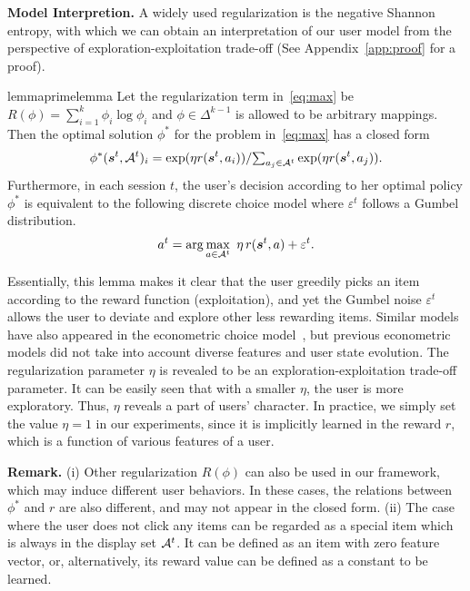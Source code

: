 \documentclass{article} %
\begin{document}
{\bf Model Interpretion.} A widely used regularization is the negative Shannon entropy, with which we can obtain an interpretation of our user model from the perspective of exploration-exploitation trade-off (See Appendix~\ref{app:proof} for a proof). 
\begin{restatable}{lemma}{primelemma}\label{lm:lemma1}
Let the regularization term in~\eqref{eq:max} be $R(\phi) = \sum_{i=1}^k \phi_i \log \phi_i$ and $\phi \in \Delta^{k-1}$ is allowed to be arbitrary mappings. Then the optimal solution $\phi^*$ for the problem in~\eqref{eq:max} has a closed form
\begin{equation}\label{eq:exp}
	\phi^\ast({\bm{s}}^t,{\mathcal{A}}^t)_i =\exp(\eta r({\bm{s}}^t, a_i))/{\textstyle \sum_{a_j \in {\mathcal{A}}^t}}\exp(\eta r({\bm{s}}^t, a_j)).
\end{equation}
Furthermore, in each session $t$, the user's decision according to her optimal policy $\phi^*$ is equivalent to the following discrete choice model where $\varepsilon^t$ follows a Gumbel distribution.
\begin{equation}\label{eq:gumbel}
 	a^t = \arg\max_{a \in {\mathcal{A}}^t }~\eta\, r({\bm{s}}^t, a) + \varepsilon^t.
 \end{equation}
\end{restatable}
\vspace{-2.5mm}
Essentially, this lemma makes it clear that the user greedily picks an item according to the reward function (exploitation), and yet the Gumbel noise $\varepsilon^t$ allows the user to deviate and explore other less rewarding items. Similar models have also appeared in the econometric choice model~\citep{Manski75,McFa73}, but previous econometric models did not take into account diverse features and user state evolution. The regularization parameter $\eta$ is revealed to be an exploration-exploitation trade-off parameter. It can be easily seen that with a smaller $\eta$, the user is more exploratory. Thus, $\eta$ reveals a part of users' character. In practice, we simply set the value $\eta=1$ in our experiments, since it is implicitly learned in the reward $r$, which is a function of various features of a user.

{\bf Remark.} (i) Other regularization $R(\phi)$ can also be used in our framework, which may induce different user behaviors. In these cases, the relations between $\phi^*$ and $r$ are also different, and may not appear in the closed form. (ii) The case where the user does not click any items can be regarded as a special item which is always in the display set ${\mathcal{A}}^t$. It can be defined as an item with zero feature vector, or, alternatively, its reward value can be defined as a constant to be learned. 
\end{document}
